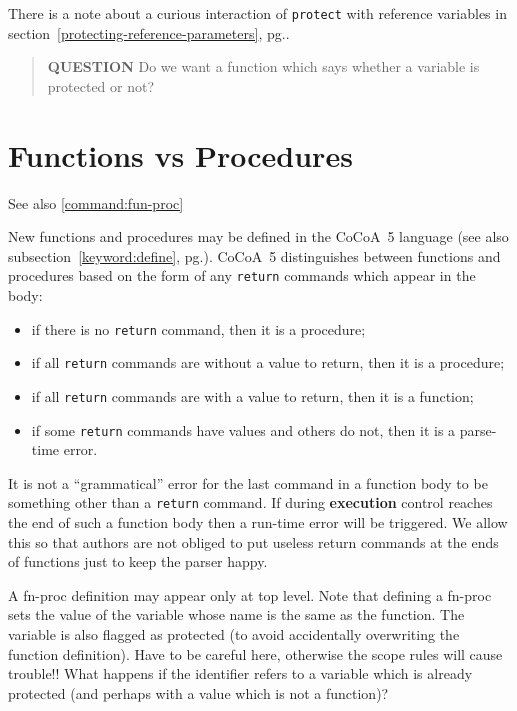 \documentclass{book}[12,a4paper]
\def\refandpage#1{{\ref{#1}, pg.\pageref{#1}}}
\begin{document}
There is a note about a curious interaction of \texttt{protect} with reference
variables in section~\refandpage{protecting-reference-parameters}.



\begin{quote}
  {\bf QUESTION} Do we want a function which says whether a variable is
  protected or not? 
\end{quote}


\section{Functions vs Procedures}
\label{defining-fns}

See also \ref{command:fun-proc}

New functions and procedures may be defined in the CoCoA~5 language (see also
subsection~\refandpage{keyword:define}).
CoCoA~5 distinguishes between functions and procedures based on the form of
any \texttt{return} commands which appear in the body:
\begin{itemize}
\item if there is no \texttt{return} command, then it is a procedure;
\item if all \texttt{return} commands are without a value to return, then it
  is a procedure;
\item if all \texttt{return} commands are with a value to return, then it is
  a function;
\item if some \texttt{return} commands have values and others do not, then it
  is a parse-time error.
\end{itemize}

It is not a ``grammatical'' error for the last command in a function
body to be something other than a \texttt{return} command.  If during
\textbf{execution} control reaches the end of such a function body
then a run-time error will be triggered.  We allow this so that
authors are not obliged to put useless return commands at the ends of
functions just to keep the parser happy.

A fn-proc definition may appear only at top level.  Note that
defining a fn-proc sets the value of the variable
whose name is the same as the function.  The variable is also flagged as
protected (to avoid accidentally overwriting the function definition).
  Have to be careful here,
otherwise the scope rules will cause trouble!!  What happens if the identifier
refers to a variable which is already protected (and perhaps with a value
which is not a function)?
\end{document}
